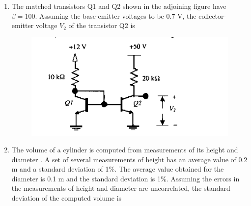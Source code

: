 \documentclass[journal,12pt,onecolumn]{IEEEtran}
\theoremstyle{remark}
\begin{document}
\begin{enumerate}
\item The matched transistors Q1 and Q2 shown in the adjoining figure have $\beta = 100$. Assuming the base-emitter voltages to be 0.7 V, the collector-emitter voltage $V_2$ of the transistor Q2 is
\begin{figure}[H]
    \centering
    \includegraphics[width = 0.7\columnwidth]{q33}
    \caption*{}
    \label{fig:Q33}
\end{figure}

\hfill{}\begin{enumerate}  \end{enumerate}

\item The volume of a cylinder is computed from measurements of its height  and diameter . A set of several measurements of height has an average value of 0.2 m and a standard deviation of 1\%. The average value obtained for the diameter is 0.1 m and the standard deviation is 1\%. Assuming the errors in the measurements of height and diameter are uncorrelated, the standard deviation of the computed volume is

\hfill{}\begin{enumerate}  \end{enumerate}




\end{enumerate}
\end{document}
